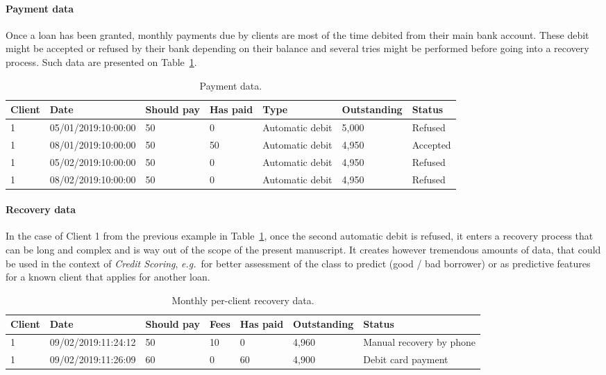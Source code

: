 \paragraph{Payment data}

Once a loan has been granted, monthly payments due by clients are most of the time debited from their main bank account. These debit might be accepted or refused by their bank depending on their balance and several tries might be performed before going into a recovery process. Such data are presented on Table~\ref{tab:payment_data}.

\begin{table}[ht]
    \centering
    \caption{Payment data.}
    \label{tab:payment_data}
    \begin{small}
\begin{tabular}{lllllll}
Client & Date & Should pay & Has paid & Type & Outstanding & Status \\
 \hline
1 & 05/01/2019:10:00:00 & 50 & 0 & Automatic debit & 5{,}000 & Refused \\
1 & 08/01/2019:10:00:00 & 50 & 50 & Automatic debit & 4{,}950 & Accepted \\
1 & 05/02/2019:10:00:00 & 50 & 0 & Automatic debit & 4{,}950 & Refused \\
1 & 08/02/2019:10:00:00 & 50 & 0 & Automatic debit & 4{,}950 & Refused
\end{tabular}
    \end{small}
\end{table}


\paragraph{Recovery data}

In the case of Client 1 from the previous example in Table~\ref{tab:payment_data}, once the second automatic debit is refused, it enters a recovery process that can be long and complex and is way out of the scope of the present manuscript. It creates however tremendous amounts of data, that could be used in the context of \textit{Credit Scoring}, \textit{e.g.}\ for better assessment of the class to predict (good / bad borrower) or as predictive features for a known client that applies for another loan.

\begin{table}[ht]
    \centering
    \caption{Monthly per-client recovery data.}
    \label{tab:recovery_data}
    \begin{small}
\begin{tabular}{lllllll}
Client & Date & Should pay & Fees & Has paid & Outstanding & Status \\
 \hline
1 & 09/02/2019:11:24:12 & 50 & 10 & 0 & 4{,}960 & Manual recovery by phone \\
1 & 09/02/2019:11:26:09 & 60 & 0 & 60 & 4{,}900 & Debit card payment \\
\end{tabular}
    \end{small}
\end{table}

